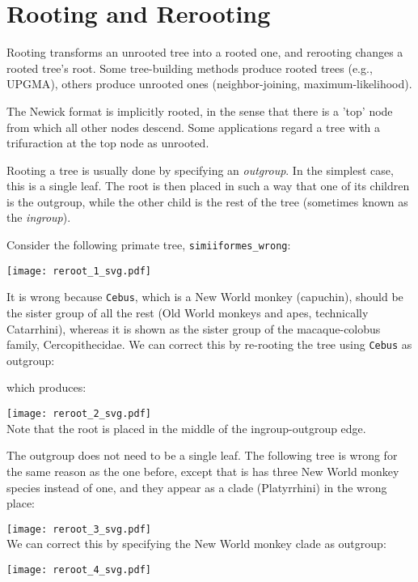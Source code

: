 
\section{Rooting and Rerooting}
\label{sct_reroot}

Rooting transforms an unrooted tree into a rooted one, and rerooting changes a rooted tree's root. Some tree-building methods produce rooted trees (e.g., \textsc{UPGMA}), others produce unrooted ones (neighbor-joining, maximum-likelihood). 

The Newick format is implicitly rooted, in the sense that there is a 'top' node from which all other nodes descend. Some applications regard a tree with a trifuraction at the top node as unrooted. 

Rooting a tree is usually done by specifying an \textit{outgroup}. In the simplest case, this is a single leaf. The root is then placed in such a way that one of its children is the outgroup, while the other child is the rest of the tree (sometimes known as the \textit{ingroup}). 

Consider the following primate tree, \texttt{simiiformes\_wrong}:

\texttt{[image: reroot\_1\_svg.pdf]}

\noindent{}It is wrong because \texttt{Cebus}, which is a New World monkey (capuchin), should be the sister group of all the rest (Old World monkeys and apes, technically Catarrhini), whereas it is shown as the sister group of the macaque-colobus family, Cercopithecidae. We can correct this by re-rooting the tree using \texttt{Cebus} as outgroup:

which produces:

\texttt{[image: reroot\_2\_svg.pdf]} \\

\noindent{}Note that the root is placed in the middle of the ingroup-outgroup
edge.

The outgroup does not need to be a single leaf. The following tree is
wrong for the same reason as the one before, except that is has three New World
monkey species instead of one, and they appear as a clade (Platyrrhini) in the
wrong place:

\texttt{[image: reroot\_3\_svg.pdf]} \\

\noindent{}We can correct this by specifying the New World monkey clade as outgroup:



\texttt{[image: reroot\_4\_svg.pdf]} \\

